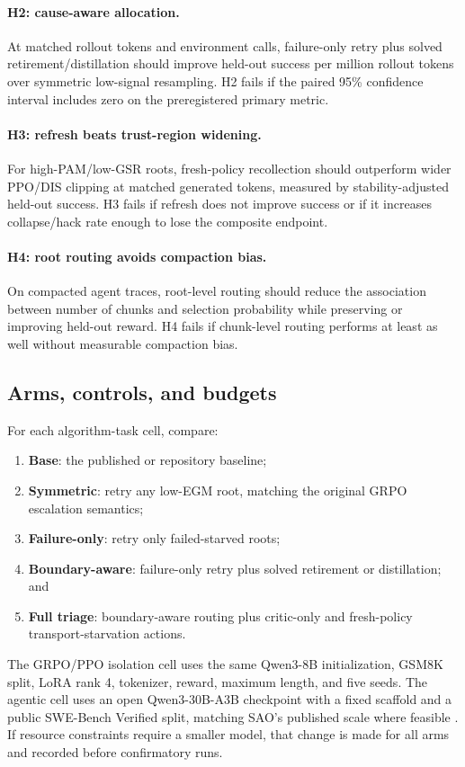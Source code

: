 \documentclass{article}
\begin{document}
\paragraph{H2: cause-aware allocation.}
At matched rollout tokens and environment calls, failure-only retry plus
solved retirement/distillation should improve held-out success per million
rollout tokens over symmetric low-signal resampling.  H2 fails if the paired
95\% confidence interval includes zero on the preregistered primary metric.

\paragraph{H3: refresh beats trust-region widening.}
For high-PAM/low-GSR roots, fresh-policy recollection should outperform wider
PPO/DIS clipping at matched generated tokens, measured by stability-adjusted
held-out success.  H3 fails if refresh does not improve success or if it
increases collapse/hack rate enough to lose the composite endpoint.

\paragraph{H4: root routing avoids compaction bias.}
On compacted agent traces, root-level routing should reduce the association
between number of chunks and selection probability while preserving or
improving held-out reward.  H4 fails if chunk-level routing performs at least
as well without measurable compaction bias.

\subsection{Arms, controls, and budgets}

For each algorithm-task cell, compare:
\begin{enumerate}[leftmargin=*,itemsep=2pt]
  \item \textbf{Base}: the published or repository baseline;
  \item \textbf{Symmetric}: retry any low-EGM root, matching the original GRPO
  escalation semantics;
  \item \textbf{Failure-only}: retry only failed-starved roots;
  \item \textbf{Boundary-aware}: failure-only retry plus solved retirement or
  distillation; and
  \item \textbf{Full triage}: boundary-aware routing plus critic-only and
  fresh-policy transport-starvation actions.
\end{enumerate}
The GRPO/PPO isolation cell uses the same Qwen3-8B initialization, GSM8K split,
LoRA rank 4, tokenizer, reward, maximum length, and five seeds.  The agentic
cell uses an open Qwen3-30B-A3B checkpoint with a fixed scaffold and a public
SWE-Bench Verified split, matching SAO's published scale where feasible
\citep{hou2026sao}.  If resource constraints require a smaller model, that
change is made for all arms and recorded before confirmatory runs.
\end{document}
